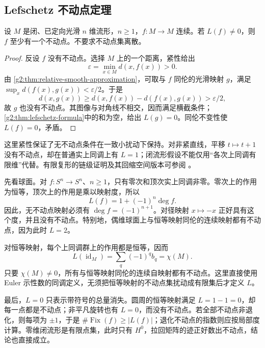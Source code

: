 \subsection{Lefschetz 不动点定理}
\label{g2:subsec:1604:04}

\begin{corollary}\label{g2:cor:lefschetz-fixed-point}
	设 \(M\) 是闭、已定向光滑 \(n\) 维流形，\(n\ge1\)，\(f:M\to M\) 连续。若 \(L(f)\ne0\)，则 \(f\) 至少有一个不动点。不要求不动点集离散。
\end{corollary}
\begin{proof}
	反设 \(f\) 没有不动点。选择 \(M\) 上的一个距离，紧性给出
	\[
		\varepsilon=\min_{x\in M}d(x,f(x))>0.
	\]
	由 \cref{g2:thm:relative-smooth-approximation}，可取与 \(f\) 同伦的光滑映射 \(g\)，满足 \(\sup_x d(f(x),g(x))<\varepsilon/2\)。于是
	\[
		d(x,g(x))\geq d(x,f(x))-d(f(x),g(x))>\varepsilon/2,
	\]
	故 \(g\) 也没有不动点。其图像与对角线不相交，因而满足横截条件；\cref{g2:thm:lefschetz-formula}中的和为空，给出 \(L(g)=0\)。同伦不变性使 \(L(f)=0\)，矛盾。
\end{proof}

这里紧性保证了无不动点条件在一致小扰动下保持。对非紧直线，平移 \(t\mapsto t+1\) 没有不动点，却在普通实上同调上有 \(L=1\)；闭流形假设不能仅用“各次上同调有限维”代替。有限复形的链级证明及其回缩空间版本可参阅 \cite[第2.C节，The Lefschetz Fixed Point Theorem]{Hatcher2002}。

\ProseParagraphBreak

先看球面。对 \(f:S^n\to S^n\)、\(n\geq1\)，只有零次和顶次实上同调非零。零次上的作用为恒等，顶次上的作用是乘以映射度，所以
\begin{equation}\label{g2:eq:sphere-lefschetz-degree}
	L(f)=1+(-1)^n\deg f.
\end{equation}
因此，无不动点映射必须有 \(\deg f=(-1)^{n+1}\)。对径映射 \(x\mapsto-x\) 正好具有这个度，并且没有不动点。特别地，偶维球面上与恒等映射同伦的连续映射都有不动点，因为此时 \(L=2\)。

对恒等映射，每个上同调群上的作用都是恒等，因而
\begin{equation}\label{g2:eq:identity-lefschetz-euler-characteristic}
	L(\operatorname{id}_M)=\sum_q(-1)^qb_q=\chi(M).
\end{equation}
只要 \(\chi(M)\ne0\)，所有与恒等映射同伦的连续自映射都有不动点。这里直接使用 Euler 示性数的同调定义，无须把恒等映射的不动点集扰动成有限集后才定义 \(L\)。

最后，\(L=0\) 只表示带符号的总量消失。圆周的恒等映射满足 \(L=1-1=0\)，却每一点都是不动点；非平凡旋转也有 \(L=0\)，而没有不动点。若全部不动点非退化，则每项为 \(\pm1\)，于是 \(\#\operatorname{Fix}(f)\geq|L(f)|\)；退化不动点的指数则应按局部度计算。零维闭流形是有限点集，此时只有 \(H^0\)，拉回矩阵的迹正好数出不动点，结论也直接成立。
